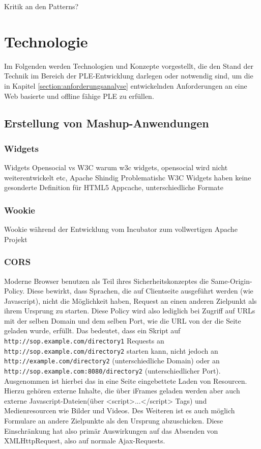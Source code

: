 Kritik an den Patterns?

\section{Technologie}
Im Folgenden werden Technologien und Konzepte vorgestellt, die den Stand der Technik im Bereich der PLE-Entwicklung darlegen oder notwendig sind, um die in Kapitel \ref{section:anforderungsanalyse} entwickelnden Anforderungen an eine Web basierte und offline fähige PLE zu erfüllen.

\subsection{Erstellung von Mashup-Anwendungen}

\subsubsection{Widgets}\label{section:widgets}
Widgets
Opensocial vs W3C
warum w3c widgets, opensocial wird nicht weiterentwickelt etc, Apache Shindig Problematishc
W3C Widgets haben keine gesonderte Definition für HTML5 Appcache,
unterschiedliche Formate

\subsubsection{Wookie}\label{section:wookie}

Wookie während der Entwicklung vom Incubator zum vollwertigen Apache Projekt

\subsubsection{CORS}\label{section:cors}
Moderne Browser benutzen als Teil ihres Sicherheitskonzeptes die Same-Origin-Policy. Diese bewirkt, dass Sprachen, die auf Clientseite ausgeführt werden (wie Javascript), nicht die Möglichkeit haben, Request an einen anderen Zielpunkt als ihrem Ursprung zu starten\cite{same_origin_policy_mozilla}. Diese Policy wird also lediglich bei Zugriff auf URLs mit der selben Domain und dem selben Port, wie die URL von der die Seite geladen wurde, erfüllt. Das bedeutet, dass ein Skript auf \texttt{http://sop.example.com/directory1} Requests an \texttt{http://sop.example.com/directory2} starten kann, nicht jedoch an \texttt{http://example.com/directory2} (unterschiedliche Domain) oder an \texttt{http://sop.example.com:8080/directory2} (unterschiedlicher Port). Ausgenommen ist hierbei das in eine Seite eingebettete Laden von Resourcen. Hierzu gehören externe Inhalte, die über iFrames geladen werden aber auch externe Javascript-Dateien(über <script>...</script> Tags) und Medienresourcen wie Bilder und Videos. Des Weiteren ist es auch möglich Formulare an andere Zielpunkte als den Ursprung abzuschicken. Diese Einschränkung hat also primär Auswirkungen auf das Absenden von XMLHttpRequest, also auf normale Ajax-Requests. 

